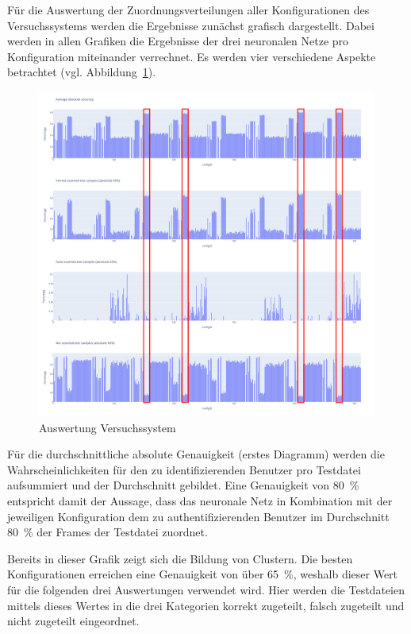 Für die Auswertung der Zuordnungsverteilungen aller Konfigurationen des Versuchssystems werden die Ergebnisse zunächst grafisch dargestellt.
Dabei werden in allen Grafiken die Ergebnisse der drei neuronalen Netze pro Konfiguration miteinander verrechnet.
Es werden vier verschiedene Aspekte betrachtet (vgl. Abbildung~\ref{fig:AuswertungVersuchssystem}).
\begin{figure}[H]
    \centering
    \includegraphics[width=1\textwidth, keepaspectratio]{images/Auswertung.png}
    \caption{Auswertung Versuchssystem}
    \label{fig:AuswertungVersuchssystem}
\end{figure}

Für die durchschnittliche absolute Genauigkeit (erstes Diagramm) werden die Wahrscheinlichkeiten für den zu identifizierenden Benutzer pro Testdatei aufsummiert und der Durchschnitt gebildet.
Eine Genauigkeit von 80~\% entspricht damit der Aussage, dass das neuronale Netz in Kombination mit der jeweiligen Konfiguration dem zu authentifizierenden Benutzer im Durchschnitt 80~\% der Frames der Testdatei zuordnet.

Bereits in dieser Grafik zeigt sich die Bildung von Clustern.
Die besten Konfigurationen erreichen eine Genauigkeit von über 65~\%, weshalb dieser Wert für die folgenden drei Auswertungen verwendet wird.
Hier werden die Testdateien mittels dieses Wertes in die drei Kategorien korrekt zugeteilt, falsch zugeteilt und nicht zugeteilt eingeordnet.

